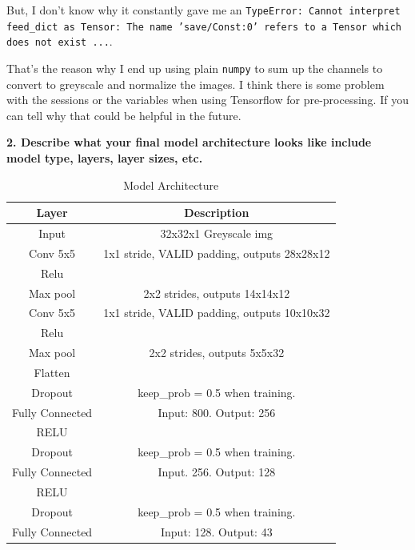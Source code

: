 \documentclass[11pt, a4paper]{article}
\begin{document}
But, I don't know why it constantly gave me an \texttt{TypeError: Cannot interpret feed\_dict as Tensor: The name 'save/Const:0' refers to a Tensor which does not exist ...}.

That's the reason why I end up using plain \texttt{numpy} to sum up the channels to convert to greyscale and normalize the images. I think there is some problem with the sessions or the variables when using Tensorflow for pre-processing. If you can tell why that could be helpful in the future.



\textbf{2. Describe what your final model architecture looks like include model type, layers, layer sizes, etc.}




\begin{table}[htpb!]
	\centering
	\caption{Model Architecture}
	\label{tab:model_arc}
	\begin{tabular}{|c|c|}
	\hline
	 Layer		& Description \\
	 \hline
	 \hline
	 Input		& 32x32x1 Greyscale img \\
	 \hline
	 Conv 5x5	& 1x1 stride, VALID padding, outputs 28x28x12 \\ 	
	 \hline
	 Relu		& \\
	 \hline
	 Max pool	& 2x2 strides, outputs 14x14x12 \\
	 \hline
	 Conv 5x5	& 1x1 stride, VALID padding, outputs 10x10x32 \\
	 \hline
	 Relu		& \\
	 \hline
	 Max pool & 2x2 strides, outputs 5x5x32 \\
	 \hline
	 Flatten	& \\
	 \hline
	 Dropout	& keep\_prob = 0.5 when training. \\
	 \hline
	 Fully Connected & Input: 800. Output: 256 \\
	 \hline
	 RELU		& \\
	 \hline
	 Dropout	& keep\_prob = 0.5 when training. \\
	 \hline
	 Fully Connected & Input. 256. Output: 128 \\
	 \hline
	 RELU & \\
	 \hline
	 Dropout	& keep\_prob = 0.5 when training. \\
	 \hline
	 Fully Connected & Input: 128. Output: 43 \\
	 \hline
	 \hline

	\end{tabular}
\end{table}
\end{document}
